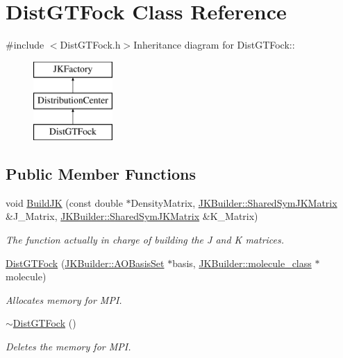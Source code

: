 \hypertarget{classGTFock_1_1DistGTFock}{
\section{DistGTFock Class Reference}
\label{classGTFock_1_1DistGTFock}
}


{\ttfamily \#include $<$DistGTFock.h$>$}Inheritance diagram for DistGTFock::\begin{figure}[H]
\begin{center}
\leavevmode
\includegraphics[height=3cm]{classGTFock_1_1DistGTFock}
\end{center}
\end{figure}
\subsection*{Public Member Functions}
\begin{DoxyCompactItemize}
\item 
void \hyperlink{classGTFock_1_1DistGTFock_aea85d0b3d84e8e52819e8a15201e078a}{BuildJK} (const double $\ast$DensityMatrix, \hyperlink{namespaceJKBuilder_aef21bc37b7cf7bc5ebb5a48628db8d0f}{JKBuilder::SharedSymJKMatrix} \&J\_\-Matrix, \hyperlink{namespaceJKBuilder_aef21bc37b7cf7bc5ebb5a48628db8d0f}{JKBuilder::SharedSymJKMatrix} \&K\_\-Matrix)
\begin{DoxyCompactList}\small\item\em The function actually in charge of building the J and K matrices. \item\end{DoxyCompactList}\item 
\hyperlink{classGTFock_1_1DistGTFock_a98b483024f3677552f2fca216363b66d}{DistGTFock} (\hyperlink{classJKBuilder_1_1AOBasisSet}{JKBuilder::AOBasisSet} $\ast$basis, \hyperlink{classJKBuilder_1_1molecule__class}{JKBuilder::molecule\_\-class} $\ast$molecule)
\begin{DoxyCompactList}\small\item\em Allocates memory for MPI. \item\end{DoxyCompactList}\item 
\hyperlink{classGTFock_1_1DistGTFock_aacafefb187ed3acf152e0b2f75cca49b}{$\sim$DistGTFock} ()
\begin{DoxyCompactList}\small\item\em Deletes the memory for MPI. \item\end{DoxyCompactList}\end{DoxyCompactItemize}
